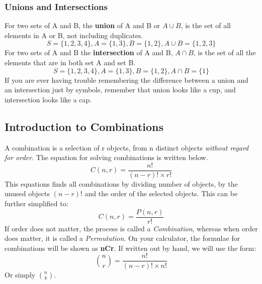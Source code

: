 \documentclass[final,1p,12pt]{elsarticle}
\begin{document}
    \subsubsection{Unions and Intersections}
    For two sets of A and B, the \textbf{union} of A and B or $A\cup B$, is the set of all elements in A or B, not including duplicates.
    \[S = \{1,2,3,4\}, A = \{1,3\}, B =\{1,2\}, A\cup B=\{1,2,3\}\]
    For two sets of A and B the \textbf{intersection} of A and B, $A\cap B$, is the set of all the elements that are in both set A and set B.
    \[S = \{1,2,3,4\}, A = \{1,3\}, B =\{1,2\}, A\cap B=\{1\}\]
    If you are ever having trouble remembering the difference between a union and an intersection just by symbols, remember that union looks like a cup, and intersection looks like a cap.
    
    \subsection{Introduction to Combinations}
    A combination is a selection of r objects, from n distinct objects \emph{without regard for order}. The equation for solving combinations is written below.
    \[C(n,r) = \frac{n!}{(n-r)!\times r!}\]
    This equations finds all combinations by dividing number of objects, by the unused objects $(n-r)!$ and the order of the selected objects. This can be further simplified to:
    \[C(n,r) = \frac{P(n,r)}{r!}\]
    If order does not matter, the process is called a \emph{Combination}, whereas when order does matter, it is called a \emph{Permutation}. On your calculator, the formulae for combinations will be shown as \textbf{nCr}. If written out by hand, we will use the form:
    \[
        \binom{n}{r} = \frac{n!}{(n-r)!\times n!}
    \]
    Or simply \(\binom{n}{k}\).
     

\clearpage\appendix


\end{document}
